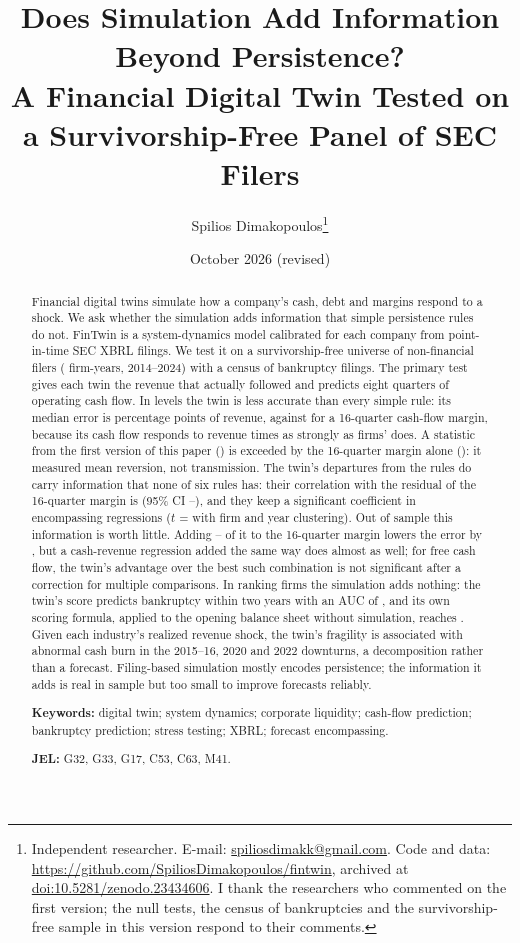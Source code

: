 \documentclass[11pt]{article}
\title{\textbf{Does Simulation Add Information Beyond Persistence?\\A Financial Digital Twin Tested on a Survivorship-Free Panel of SEC Filers}}
\author{Spilios Dimakopoulos\thanks{Independent researcher. E-mail: \href{mailto:spiliosdimakk@gmail.com}{spiliosdimakk@gmail.com}. Code and data: \url{https://github.com/SpiliosDimakopoulos/fintwin}, archived at \href{https://doi.org/10.5281/zenodo.23434606}{doi:10.5281/zenodo.23434606}. I thank the researchers who commented on the first version; the null tests, the census of bankruptcies and the survivorship-free sample in this version respond to their comments.}}
\date{October 2026 (revised)}
\newcommand{\twin}{FinTwin}
\begin{document}
\maketitle

\begin{abstract}
\noindent Financial digital twins simulate how a company's cash, debt and margins respond to a shock. We ask whether the simulation adds information that simple persistence rules do not. \twin{} is a system-dynamics model calibrated for each company from point-in-time SEC XBRL filings. We test it on a survivorship-free universe of \UniverseN{} non-financial filers (\PanFirmYears{} firm-years, 2014--2024) with a census of bankruptcy filings. The primary test gives each twin the revenue that actually followed and predicts eight quarters of operating cash flow. In levels the twin is less accurate than every simple rule: its median error is \TrMaeTone{} percentage points of revenue, against \TrMaeNthree{} for a 16-quarter cash-flow margin, because its cash flow responds to revenue \ElastCfoRatio{} times as strongly as firms' does. A statistic from the first version of this paper (\TrIncrTwin) is exceeded by the 16-quarter margin alone (\TrIncrSixteen): it measured mean reversion, not transmission. The twin's departures from the rules do carry information that none of six rules has: their correlation with the residual of the 16-quarter margin is \TrTwinVsSixteen{} (95\% CI \TrTwinVsSixteenLo--\TrTwinVsSixteenHi), and they keep a significant coefficient in encompassing regressions ($t$ = \TrEncTwinTTwoWay{} with firm and year clustering). Out of sample this information is worth little. Adding \TrLambdaLo--\TrLambdaHi{} of it to the 16-quarter margin lowers the error by \TrHybGainPct, but a cash-revenue regression added the same way does almost as well; for free cash flow, the twin's advantage over the best such combination is not significant after a correction for multiple comparisons. In ranking firms the simulation adds nothing: the twin's score predicts bankruptcy within two years with an AUC of \BkPanTwin, and its own scoring formula, applied to the opening balance sheet without simulation, reaches \BkPanFormula. Given each industry's realized revenue shock, the twin's fragility is associated with abnormal cash burn in the 2015--16, 2020 and 2022 downturns, a decomposition rather than a forecast. Filing-based simulation mostly encodes persistence; the information it adds is real in sample but too small to improve forecasts reliably.

\medskip\noindent\textbf{Keywords:} digital twin; system dynamics; corporate liquidity; cash-flow prediction; bankruptcy prediction; stress testing; XBRL; forecast encompassing.

\noindent\textbf{JEL:} G32, G33, G17, C53, C63, M41.
\end{abstract}
\end{document}
